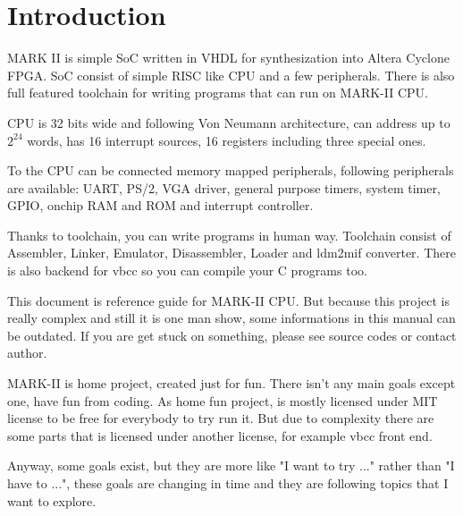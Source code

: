 \section{Introduction}

MARK II is simple SoC written in VHDL for synthesization into Altera Cyclone
FPGA. SoC consist of simple RISC like CPU and a few peripherals. There is also
full featured toolchain for writing programs that can run on MARK-II CPU.

CPU is 32 bits wide and following Von Neumann architecture, can address up to
$2^{24}$ words, has 16 interrupt sources, 16 registers including three special
ones.

To the CPU can be connected memory mapped peripherals, following peripherals
are available: UART, PS/2, VGA driver, general purpose timers, system timer,
GPIO, onchip RAM and ROM and interrupt controller.

Thanks to toolchain, you can write programs in human way. Toolchain consist of
Assembler, Linker, Emulator, Disassembler, Loader and ldm2mif converter. There is
also backend for vbcc so you can compile your C programs too.

This document is reference guide for MARK-II CPU. But because this project is really
complex and still it is one man show, some informations in this manual can be
outdated. If you are get stuck on something, please see source codes or
contact author.

MARK-II is home project, created just for fun. There isn't any main goals
except one, have fun from coding. As home fun project, is mostly licensed under
MIT license to be free for everybody to try run it. But due to complexity there
are some parts that is licensed under another license, for example vbcc front
end.

Anyway, some goals exist, but they are more like "I want to try ..." rather than
"I have to ...", these goals are changing in time and they are following topics
that I want to explore.
